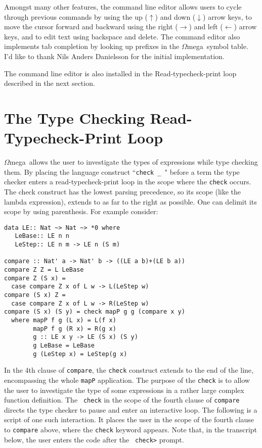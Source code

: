 \documentclass[11pt,twoside]{article}
\newcommand{\om}{$\Omega$mega}
\begin{document}
Amongst many other features, the command line editor allows users
to cycle through previous commands by using the up ($\uparrow$)
and down ($\downarrow$) arrow keys, to move the cursor forward and
backward using the right ($\rightarrow$) and left ($\leftarrow$)
arrow keys, and to edit text using backspace and delete. The
command editor also implements tab completion by looking up
prefixes in the \om\ symbol table. I'd like to thank 
Nils Anders Danielsson for the initial implementation.

The command line editor is also installed in the Read-typecheck-print
loop described in the next section.


\vspace*{.2in}

\section{The Type Checking Read-Typecheck-Print Loop} \label{typechecker}
\om\ allows the user to investigate the types of expressions while type
checking them. By placing the language construct ``{\tt check \_ }" before a
term the type checker enters a read-typecheck-print loop in the scope where
the {\tt check} occurs. The check construct has the lowest parsing
precedence, so its scope (like the lambda expression), extends to as far to
the right as possible. One can delimit its scope by using parenthesis.
For example consider:

\begin{verbatim}
data LE:: Nat ~> Nat ~> *0 where
   LeBase:: LE n n
   LeStep:: LE n m -> LE n (S m)

compare :: Nat' a -> Nat' b -> ((LE a b)+(LE b a))
compare Z Z = L LeBase
compare Z (S x) = 
  case compare Z x of L w -> L(LeStep w)
compare (S x) Z =
  case compare Z x of L w -> R(LeStep w)
compare (S x) (S y) = check mapP g g (compare x y)
  where mapP f g (L x) = L(f x)
        mapP f g (R x) = R(g x)
        g :: LE x y -> LE (S x) (S y)
        g LeBase = LeBase
        g (LeStep x) = LeStep(g x)
\end{verbatim}
In the 4th clause of {\tt compare}, the {\tt check} construct
extends to the end of the line, encompassing the whole {\tt mapP}
application. The purpose of the {\tt check} is to allow the user to investigate the type
of some expressions in a rather large complex function definition. The {\tt
check} in the scope of the fourth clause of {\tt compare} directs the type
checker to pause and enter an interactive loop. The following is a script
of one such interaction. It places the user in the scope of the fourth
clause to {\tt compare} above, where the {\tt check} keyword appears. Note
that, in the transcript below, the user enters the code after the {\tt
check>} prompt.
\end{document}
